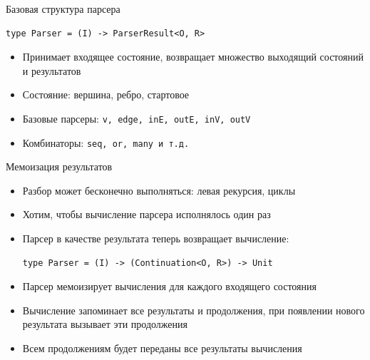 \documentclass[aspectratio=169]{beamer}
\begin{document}
\begin{frame}[fragile]{Базовая структура парсера}
  \begin{verbatim}
type Parser = (I) -> ParserResult<O, R>
  \end{verbatim}
  \begin{itemize}
    \item Принимает входящее состояние, возвращает множество выходящий состояний и результатов
    \item Состояние: вершина, ребро, стартовое
    \item Базовые парсеры: \texttt{v, edge, inE, outE, inV, outV}
    \item Комбинаторы: \texttt{seq, or, many и т.д.}
  \end{itemize}

\end{frame}




\begin{frame}[fragile]{Мемоизация результатов}
  \begin{itemize}
    \item Разбор может бесконечно выполняться: левая рекурсия, циклы
    
    \item Хотим, чтобы вычисление парсера исполнялось один раз

    \item Парсер в качестве результата теперь возвращает вычисление: 
    \begin{verbatim}
type Parser = (I) -> (Continuation<O, R>) -> Unit
\end{verbatim}
    \item Парсер мемоизирует вычисления для каждого входящего состояния

    \item Вычисление запоминает все результаты и продолжения, при появлении нового результата вызывает эти продолжения
    
    \item Всем продолжениям будет переданы все результаты вычисления
    
  \end{itemize}
\end{frame}
\end{document}
